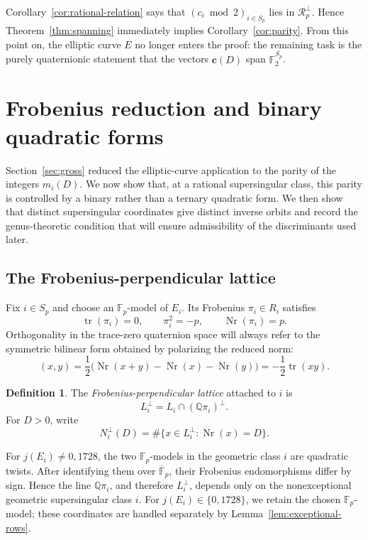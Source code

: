 \documentclass[11pt]{amsart}
\theoremstyle{definition}
\newtheorem*{definition*}{Definition}
\theoremstyle{remark}
\newcommand{\Q}{\mathbb{Q}}
\newcommand{\F}{\mathbb{F}}
\newcommand{\tr}{\operatorname{tr}}
\newcommand{\Nr}{\operatorname{Nr}}
\newcommand{\crow}{\mathbf{c}}
\newcommand{\Rp}{\mathcal{R}_p}
\begin{document}
Corollary~\ref{cor:rational-relation} says that $(c_i\bmod2)_{i\in S_p}$ lies in $\Rp^\perp$.  Hence Theorem~\ref{thm:spanning} immediately implies Corollary~\ref{cor:parity}.  From this point on, the elliptic curve $E$ no longer enters the proof: the remaining task is the purely quaternionic statement that the vectors $\crow(D)$ span $\F_2^{S_p}$.

\section{Frobenius reduction and binary quadratic forms}\label{sec:binary}

Section~\ref{sec:gross} reduced the elliptic-curve application to the
parity of the integers $m_i(D)$. We now show that, at a rational
supersingular class, this parity is controlled by a binary rather than a
ternary quadratic form. We then show that distinct supersingular
coordinates give distinct inverse orbits and record the
genus-theoretic condition that will ensure admissibility of the
discriminants used later.

\subsection{The Frobenius-perpendicular lattice}

Fix $i\in S_p$ and choose an $\F_p$-model of $E_i$.  Its Frobenius $\pi_i\in R_i$ satisfies
\[
  \tr(\pi_i)=0,
  \qquad \pi_i^2=-p,
  \qquad \Nr(\pi_i)=p.
\]
Orthogonality in the trace-zero quaternion space will always refer to the
symmetric bilinear form obtained by polarizing the reduced norm:
\[
  (x,y)=\frac12\bigl(\Nr(x+y)-\Nr(x)-\Nr(y)\bigr)
       =-\frac12\tr(xy).
\]

\begin{definition*}
The \emph{Frobenius-perpendicular lattice} attached to $i$ is
\[
  L_i^\perp=L_i\cap(\Q\pi_i)^\perp.
\]
For $D>0$, write
\[
  N_i^\perp(D)=\#\{x\in L_i^\perp:\Nr(x)=D\}.
\]
\end{definition*}


For $j(E_i)\ne0,1728$, the two $\F_p$-models in the geometric class
$i$ are quadratic twists. After identifying them over
$\overline{\F}_p$, their Frobenius endomorphisms differ by sign. Hence
the line $\Q\pi_i$, and therefore $L_i^\perp$, depends only on the
nonexceptional geometric supersingular class $i$. For $j(E_i) \in \{0,1728\}$, we
retain the chosen $\F_p$-model; these coordinates are handled separately
by Lemma~\ref{lem:exceptional-rows}.
\end{document}
